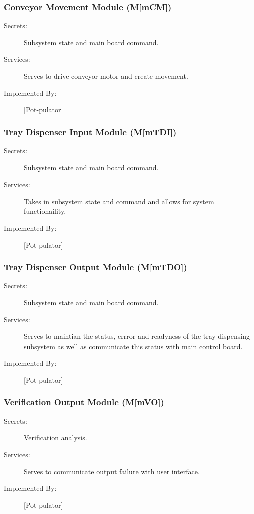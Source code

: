 \documentclass[12pt, titlepage]{article}
\newcommand{\mref}[1]{M\ref{#1}}
\begin{document}
\subsubsection{Conveyor Movement Module (\mref{mCM})}
\begin{description}
\item[Secrets:] Subsystem state and main board command.
\item[Services:] Serves to drive conveyor motor and create movement.
\item[Implemented By:] [Pot-pulator]

\end{description}

\subsubsection{Tray Dispenser Input Module (\mref{mTDI})}
\begin{description}
\item[Secrets:] Subsystem state and main board command.
\item[Services:] Takes in subsystem state and command and allows for system functionaility.
\item[Implemented By:] [Pot-pulator]

\end{description}

\subsubsection{Tray Dispenser Output Module (\mref{mTDO})}
\begin{description}
\item[Secrets:] Subsystem state and main board command.
\item[Services:] Serves to maintian the status, errror and readyness of the tray dispensing subsystem as well as
communicate this status with main control board.
\item[Implemented By:] [Pot-pulator]

\end{description}

\subsubsection{Verification Output Module (\mref{mVO})}
\begin{description}
\item[Secrets:] Verification analysis.
\item[Services:] Serves to communicate output failure with user interface.
\item[Implemented By:] [Pot-pulator]

\end{description}
\end{document}
